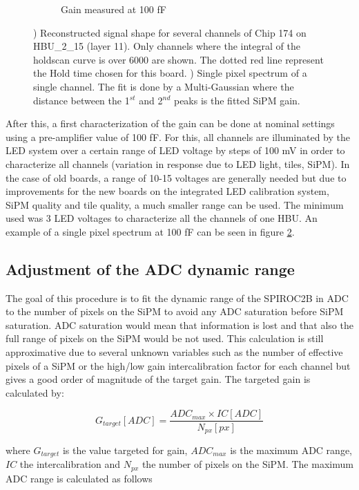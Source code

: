 \begin{figure}[htbp!]
\begin{subfigure}[t]{0.49\textwidth}
    \caption{Gain measured at 100 fF} \label{fig:Gain100fF}
  \end{subfigure}
  \caption{) Reconstructed signal shape for several channels of Chip 174 on HBU\_{}2\_{}15 (layer 11). Only channels where the integral of the holdscan curve is over 6000 are shown. The dotted red line represent the Hold time chosen for this board. ) Single pixel spectrum of a single channel. The fit is done by a Multi-Gaussian where the distance between the 1$^{st}$ and 2$^{nd}$ peaks is the fitted SiPM gain.}
\end{figure}

After this, a first characterization of the gain can be done at nominal settings using a pre-amplifier value of 100 fF. For this, all channels are illuminated by the LED system over a certain range of LED voltage by steps of 100 mV in order to characterize all channels (variation in response due to LED light, tiles, SiPM). In the case of old boards, a range of 10-15 voltages are generally needed but due to improvements for the new boards on the integrated LED calibration system, SiPM quality and tile quality, a much smaller range can be used. The minimum used was 3 LED voltages to characterize all the channels of one HBU. An example of a single pixel spectrum at 100 fF can be seen in figure \ref{fig:Gain100fF}.

\subsection{Adjustment of the ADC dynamic range}

The goal of this procedure is to fit the dynamic range of the SPIROC2B in ADC to the number of pixels on the SiPM to avoid any ADC saturation before SiPM saturation. ADC saturation would mean that information is lost and that also the full range of pixels on the SiPM would be not used. This calculation is still approximative due to several unknown variables such as the number of effective pixels of a SiPM or the high/low gain intercalibration factor for each channel but gives a good order of magnitude of the target gain. The targeted gain is calculated by:

\begin{equation}
  G_{target} [ADC] = \frac{ADC_{max} \times IC [ADC]}{N_{px} [px]}
\end{equation}

where $G_{target}$ is the value targeted for gain, $ADC_{max}$ is the maximum ADC range, $IC$ the intercalibration and $N_{px}$ the number of pixels on the SiPM. The maximum ADC range is calculated as follows

